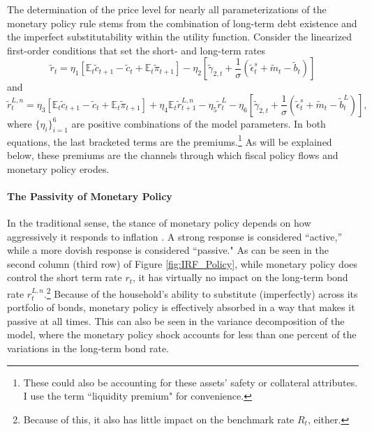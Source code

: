 \documentclass[11pt,a4paper,margin=1.5in]{article}
\begin{document}
The determination of the price level for nearly all parameterizations of the monetary policy rule stems from the combination of long-term debt existence and the imperfect substitutability within the utility function.
Consider the linearized first-order conditions that set the short- and long-term rates
\begin{equation}
\label{eq:ShortRates}
	\tilde{r}_t = \eta_1 \left[\mathbb{E}_t\tilde{c}_{t+1} - \tilde{c}_t + \mathbb{E}_t\tilde{\pi}_{t+1}\right] - \eta_2 \left[\tilde{\gamma}_{2,t} + \frac{1}{\sigma}\left(\tilde{\epsilon}^s_t + \tilde{m}_t - \tilde{b}_t\right)\right]
\end{equation}
and
\begin{equation}
\label{eq:LongRates}
	\tilde{r}^{L,n}_t = \eta_3 \left[\mathbb{E}_t\tilde{c}_{t+1} - \tilde{c}_t + \mathbb{E}_t\tilde{\pi}_{t+1}\right] + \eta_4 \mathbb{E}_t\tilde{r}^{L,n}_{t+1} - \eta_5 \tilde{r}^L_t - \eta_6 \left[\tilde{\gamma}_{2,t} + \frac{1}{\sigma}\left(\tilde{\epsilon}^s_t + \tilde{m}_t - \tilde{b}^L_t\right)\right],
\end{equation}
where $\{\eta_i\}_{i=1}^6$ are positive combinations of the model parameters. 
In both equations, the last bracketed terms are the premiums.\footnote{
	These could also be accounting for these assets' safety or collateral attributes.
	I use the term ``liquidity premium" for convenience.}
As will be explained below, these premiums are the channels through which fiscal policy flows and monetary policy erodes.

\paragraph{The Passivity of Monetary Policy}
In the traditional sense, the stance of monetary policy depends on how aggressively it responds to inflation \citep{Leeper:1991}.
A strong response is considered ``active,'' while a more dovish response is considered ``passive."
As can be seen in the second column (third row) of Figure \ref{fig:IRF_Policy}, while monetary policy does control the short term rate $r_t$, it has virtually no impact on the long-term bond rate $r^{L,n}_t$.\footnote{Because of this, it also has little impact on the benchmark rate $R_t$, either.}
Because of the household's ability to substitute (imperfectly) across its portfolio of bonds, monetary policy is effectively absorbed in a way that makes it passive at all times. 
This can also be seen in the variance decomposition of the model, where the monetary policy shock accounts for less than one percent of the variations in the long-term bond rate. 
\end{document}
